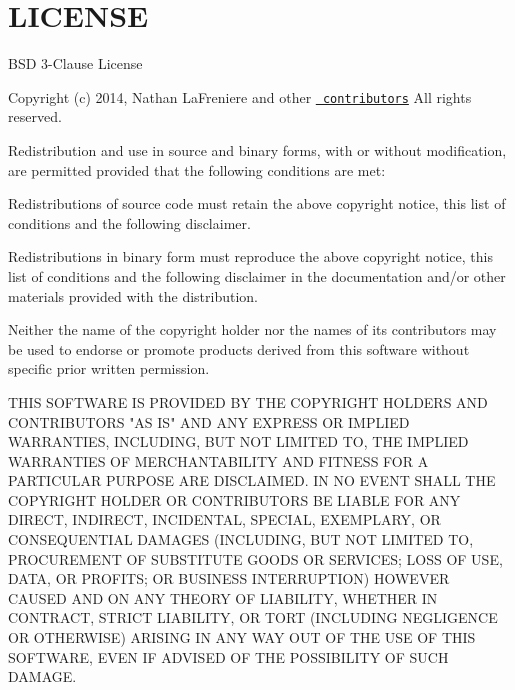 \chapter{LICENSE}
\hypertarget{md_docker-compose-example-main_2node__modules_2qs_2_l_i_c_e_n_s_e}{}\label{md_docker-compose-example-main_2node__modules_2qs_2_l_i_c_e_n_s_e}
BSD 3-\/Clause License

Copyright (c) 2014, Nathan La\+Freniere and other \href{https://github.com/ljharb/qs/graphs/contributors}{\texttt{ contributors}} All rights reserved.

Redistribution and use in source and binary forms, with or without modification, are permitted provided that the following conditions are met\+:


\begin{DoxyEnumerate}
\item Redistributions of source code must retain the above copyright notice, this list of conditions and the following disclaimer.
\item Redistributions in binary form must reproduce the above copyright notice, this list of conditions and the following disclaimer in the documentation and/or other materials provided with the distribution.
\item Neither the name of the copyright holder nor the names of its contributors may be used to endorse or promote products derived from this software without specific prior written permission.
\end{DoxyEnumerate}

THIS SOFTWARE IS PROVIDED BY THE COPYRIGHT HOLDERS AND CONTRIBUTORS "{}\+AS IS"{} AND ANY EXPRESS OR IMPLIED WARRANTIES, INCLUDING, BUT NOT LIMITED TO, THE IMPLIED WARRANTIES OF MERCHANTABILITY AND FITNESS FOR A PARTICULAR PURPOSE ARE DISCLAIMED. IN NO EVENT SHALL THE COPYRIGHT HOLDER OR CONTRIBUTORS BE LIABLE FOR ANY DIRECT, INDIRECT, INCIDENTAL, SPECIAL, EXEMPLARY, OR CONSEQUENTIAL DAMAGES (INCLUDING, BUT NOT LIMITED TO, PROCUREMENT OF SUBSTITUTE GOODS OR SERVICES; LOSS OF USE, DATA, OR PROFITS; OR BUSINESS INTERRUPTION) HOWEVER CAUSED AND ON ANY THEORY OF LIABILITY, WHETHER IN CONTRACT, STRICT LIABILITY, OR TORT (INCLUDING NEGLIGENCE OR OTHERWISE) ARISING IN ANY WAY OUT OF THE USE OF THIS SOFTWARE, EVEN IF ADVISED OF THE POSSIBILITY OF SUCH DAMAGE. 